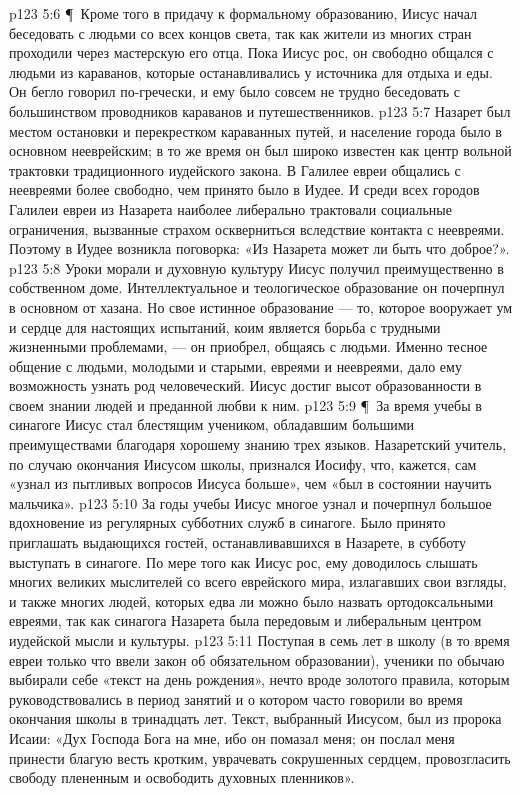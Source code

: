 \vs p123 5:6 \P\ Кроме того в придачу к формальному образованию, Иисус начал беседовать с людьми со всех концов света, так как жители из многих стран проходили через мастерскую его отца. Пока Иисус рос, он свободно общался с людьми из караванов, которые останавливались у источника для отдыха и еды. Он бегло говорил по\hyp{}гречески, и ему было совсем не трудно беседовать с большинством проводников караванов и путешественников.
\vs p123 5:7 Назарет был местом остановки и перекрестком караванных путей, и население города было в основном нееврейским; в то же время он был широко известен как центр вольной трактовки традиционного иудейского закона. В Галилее евреи общались с неевреями более свободно, чем принято было в Иудее. И среди всех городов Галилеи евреи из Назарета наиболее либерально трактовали социальные ограничения, вызванные страхом оскверниться вследствие контакта с неевреями. Поэтому в Иудее возникла поговорка: «Из Назарета может ли быть что доброе?».
\vs p123 5:8 Уроки морали и духовную культуру Иисус получил преимущественно в собственном доме. Интеллектуальное и теологическое образование он почерпнул в основном от хазана. Но свое истинное образование --- то, которое вооружает ум и сердце для настоящих испытаний, коим является борьба с трудными жизненными проблемами, --- он приобрел, общаясь с людьми. Именно тесное общение с людьми, молодыми и старыми, евреями и неевреями, дало ему возможность узнать род человеческий. Иисус достиг высот образованности в своем знании людей и преданной любви к ним.
\vs p123 5:9 \P\ За время учебы в синагоге Иисус стал блестящим учеником, обладавшим большими преимуществами благодаря хорошему знанию трех языков. Назаретский учитель, по случаю окончания Иисусом школы, признался Иосифу, что, кажется, сам «узнал из пытливых вопросов Иисуса больше», чем «был в состоянии научить мальчика».
\vs p123 5:10 За годы учебы Иисус многое узнал и почерпнул большое вдохновение из регулярных субботних служб в синагоге. Было принято приглашать выдающихся гостей, останавливавшихся в Назарете, в субботу выступать в синагоге. По мере того как Иисус рос, ему доводилось слышать многих великих мыслителей со всего еврейского мира, излагавших свои взгляды, и также многих людей, которых едва ли можно было назвать ортодоксальными евреями, так как синагога Назарета была передовым и либеральным центром иудейской мысли и культуры.
\vs p123 5:11 Поступая в семь лет в школу (в то время евреи только что ввели закон об обязательном образовании), ученики по обычаю выбирали себе «текст на день рождения», нечто вроде золотого правила, которым руководствовались в период занятий и о котором часто говорили во время окончания школы в тринадцать лет. Текст, выбранный Иисусом, был из пророка Исаии: «Дух Господа Бога на мне, ибо он помазал меня; он послал меня принести благую весть кротким, уврачевать сокрушенных сердцем, провозгласить свободу плененным и освободить духовных пленников».
